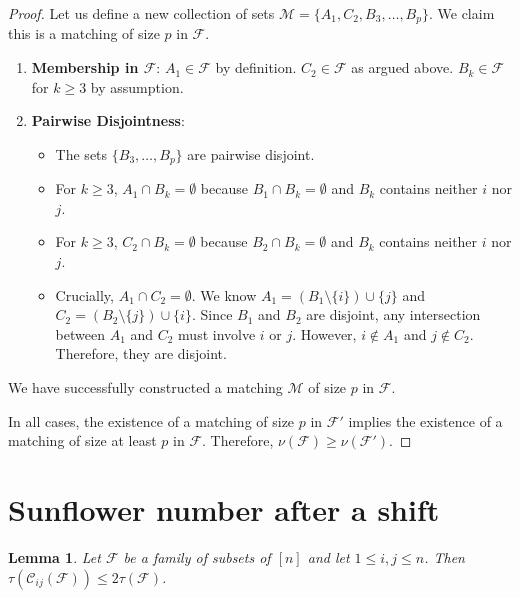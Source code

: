 \documentclass[runningheads,12pt,a4paper]{article}
\newtheorem{lemma}{Lemma}
\begin{document}
\begin{proof}
	Let us define a new collection of sets $\mathcal{M} = \{A_1, C_2, B_3, \dots, B_p\}$. We claim this is a matching of size $p$ in $\mathcal{F}$.
	\begin{enumerate}
		\item \textbf{Membership in $\mathcal{F}$}: $A_1 \in \mathcal{F}$ by definition. $C_2 \in \mathcal{F}$ as argued above. $B_k \in \mathcal{F}$ for $k \geq 3$ by assumption.
		\item \textbf{Pairwise Disjointness}:
		\begin{itemize}
			\item The sets $\{B_3, \dots, B_p\}$ are pairwise disjoint.
			\item For $k \geq 3$, $A_1 \cap B_k = \emptyset$ because $B_1 \cap B_k = \emptyset$ and $B_k$ contains neither $i$ nor $j$.
			\item For $k \geq 3$, $C_2 \cap B_k = \emptyset$ because $B_2 \cap B_k = \emptyset$ and $B_k$ contains neither $i$ nor $j$.
			\item Crucially, $A_1 \cap C_2 = \emptyset$. We know $A_1 = (B_1 \setminus \{i\}) \cup \{j\}$ and $C_2 = (B_2 \setminus \{j\}) \cup \{i\}$. Since $B_1$ and $B_2$ are disjoint, any intersection between $A_1$ and $C_2$ must involve $i$ or $j$. However, $i \notin A_1$ and $j \notin C_2$. Therefore, they are disjoint.
		\end{itemize}
	\end{enumerate}
	We have successfully constructed a matching $\mathcal{M}$ of size $p$ in $\mathcal{F}$.
	
	In all cases, the existence of a matching of size $p$ in $\mathcal{F}'$ implies the existence of a matching of size at least $p$ in $\mathcal{F}$. Therefore, $\nu(\mathcal{F}) \ge \nu(\mathcal{F}')$. 
\end{proof}

\section{Sunflower number  after a shift}\label{app:2}
\begin{lemma}
	Let $\mathcal{F}$ be a family of subsets of $[n]$ and let $1 \leq i, j \leq n$. Then  $\tau(\mathcal{C}_{ij}(\mathcal{F})) \leq 2\tau(\mathcal{F})$.
\end{lemma}
\end{document}
